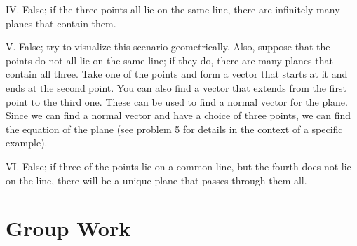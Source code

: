 \documentclass[noauthor]{ximera}
\begin{document}
\begin{problem}
\begin{freeResponse}
 IV. False; if the three points all lie on the same line, there are infinitely many planes that contain them.
 
 V. False; try to visualize this scenario geometrically.  Also, suppose that the points do not all lie on the same line; if they do, there are many planes that contain all three.  Take one of the points and form a vector that starts at it and ends at the second point.  You can also find a vector that extends from the first point to the third one.  These can be used to find a normal vector for the plane.  Since we can find a normal vector and have a choice of three points, we can find the equation of the plane (see problem 5 for details in the context of a specific example).
 
 VI. False; if three of the points lie on a common line, but the fourth does not lie on the line, there will be a unique plane that passes through them all.
 
\end{freeResponse}
\end{problem}


\section{Group Work}
\end{document}
